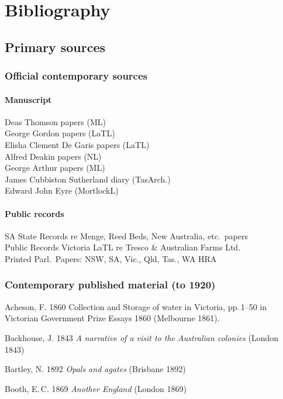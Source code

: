
\chapter{Bibliography}


\section*{Primary sources}

\subsection*{Official contemporary sources}

\subsubsection*{Manuscript}
Deas Thomson papers (ML)\\
George Gordon papers (LaTL)\\
Elisha Clement De Garis papers (LaTL)\\
Alfred Deakin papers (NL)\\
George Arthur papers (ML)\\
James Cubbiston Sutherland diary (TasArch.)\\
Edward John Eyre (MortlockL)

\subsubsection*{Public records}
SA State Records re Menge, Reed Beds, New Australia, etc.\ papers\\
Public Records Victoria LaTL re Tresco \& Australian Farms Ltd.\\
Printed Parl.\ Papers: NSW, SA, Vic., Qld, Tas., WA HRA\\

\subsection*{Contemporary published material (to 1920)}
Acheson, F. 1860 Collection and Storage of water in Victoria,
pp.\,1--50 in Victorian Government Prize Essays 1860 (Melbourne 1861).

Backhouse, J. 1843 \textit{A narrative of a visit to the Australian
colonies} (London 1843)

Bartley, N. 1892 \textit{Opals and agates} (Brisbane 1892)

Booth, E.\,C. 1869 \textit{Another England} (London 1869)

